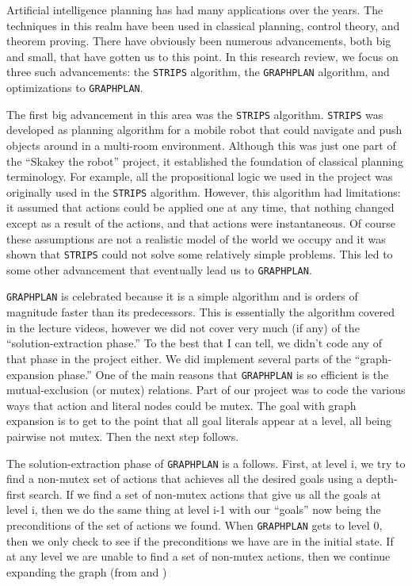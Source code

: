 \documentclass{article}
\newcommand{\GRAPHPLAN}{\texttt{GRAPHPLAN}}
\newcommand{\STRIPS}{\texttt{STRIPS}}
\begin{document}
Artificial intelligence planning has had many applications over the years. The techniques in this realm have been used in classical planning, control theory, and theorem proving.\cite{AMIA} There have obviously been numerous advancements, both big and small, that have gotten us to this point. In this research review, we focus on three such advancements: the \STRIPS{} algorithm, the \GRAPHPLAN{} algorithm, and optimizations to \GRAPHPLAN{}.

The first big advancement in this area was the \STRIPS{} algorithm. \STRIPS{} was developed as planning algorithm for a mobile robot that could navigate and push objects around in a multi-room environment\cite{StripsRevisit}. Although this was just one part of the ``Skakey the robot'' project, it established the foundation of classical planning terminology. For example, all the propositional logic we used in the project was originally used in the \STRIPS{} algorithm\cite{Weld1999}. However, this algorithm had limitations: it assumed that actions could be applied one at any time, that nothing changed except as a result of the actions, and that actions were instantaneous\cite{StripsRevisit}. Of course these assumptions are not a realistic model of the world we occupy and it was shown that \STRIPS{} could not solve some relatively simple problems\cite{AMIA}. This led to some other advancement that eventually lead us to \GRAPHPLAN{}.

\GRAPHPLAN{} is celebrated because it is a simple algorithm and is orders of magnitude faster than its predecessors\cite{Weld1999}. This is essentially the algorithm covered in the lecture videos, however we did not cover very much (if any) of the ``solution-extraction phase.'' To the best that I can tell, we didn't code any of that phase in the project either. We did implement several parts of the ``graph-expansion phase.'' One of the main reasons that \GRAPHPLAN{} is so efficient is the mutual-exclusion (or mutex) relations. Part of our project was to code the various ways that action and literal nodes could be mutex. The goal with graph expansion is to get to the point that all goal literals appear at a level, all being pairwise not mutex. Then the next step follows.

The solution-extraction phase of \GRAPHPLAN{} is a follows. First, at level i, we try to find a non-mutex set of actions that achieves all the desired goals using a depth-first search. If we find a set of non-mutex actions that give us all the goals at level i, then we do the same thing at level i-1 with our ``goals'' now being the preconditions of the set of actions we found. When \GRAPHPLAN{} gets to level 0, then we only check to see if the preconditions we have are in the initial state. If at any level we are unable to find a set of non-mutex actions, then we continue expanding the graph (from \cite{AMIA} and \cite{Weld1999})
\end{document}
